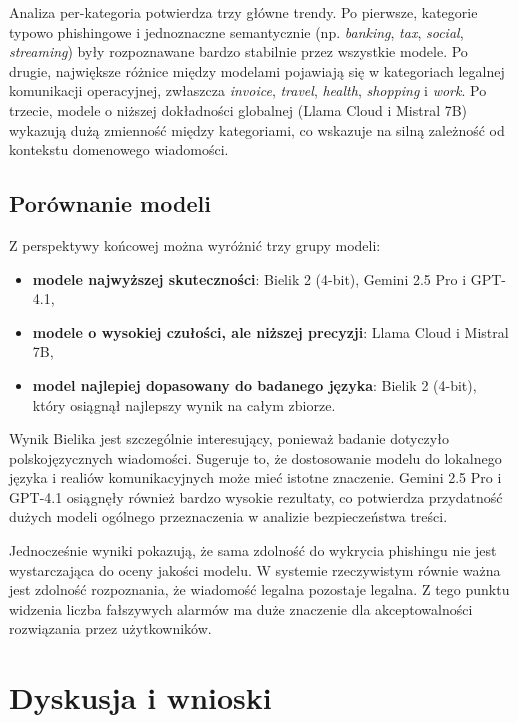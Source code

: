 \documentclass[12pt,a4paper,openany]{report}
\begin{document}
Analiza per-kategoria potwierdza trzy główne trendy. Po pierwsze, kategorie typowo phishingowe i jednoznaczne semantycznie (np. \textit{banking}, \textit{tax}, \textit{social}, \textit{streaming}) były rozpoznawane bardzo stabilnie przez wszystkie modele. Po drugie, największe różnice między modelami pojawiają się w kategoriach legalnej komunikacji operacyjnej, zwłaszcza \textit{invoice}, \textit{travel}, \textit{health}, \textit{shopping} i \textit{work}. Po trzecie, modele o niższej dokładności globalnej (Llama Cloud i Mistral 7B) wykazują dużą zmienność między kategoriami, co wskazuje na silną zależność od kontekstu domenowego wiadomości.

\section{Porównanie modeli}

Z perspektywy końcowej można wyróżnić trzy grupy modeli:

\begin{itemize}
    \item \textbf{modele najwyższej skuteczności}: Bielik 2 (4-bit), Gemini 2.5 Pro i GPT-4.1,
    \item \textbf{modele o wysokiej czułości, ale niższej precyzji}: Llama Cloud i Mistral 7B,
    \item \textbf{model najlepiej dopasowany do badanego języka}: Bielik 2 (4-bit), który osiągnął najlepszy wynik na całym zbiorze.
\end{itemize}

Wynik Bielika jest szczególnie interesujący, ponieważ badanie dotyczyło polskojęzycznych wiadomości. Sugeruje to, że dostosowanie modelu do lokalnego języka i realiów komunikacyjnych może mieć istotne znaczenie. Gemini 2.5 Pro i GPT-4.1 osiągnęły również bardzo wysokie rezultaty, co potwierdza przydatność dużych modeli ogólnego przeznaczenia w analizie bezpieczeństwa treści.

Jednocześnie wyniki pokazują, że sama zdolność do wykrycia phishingu nie jest wystarczająca do oceny jakości modelu. W systemie rzeczywistym równie ważna jest zdolność rozpoznania, że wiadomość legalna pozostaje legalna. Z tego punktu widzenia liczba fałszywych alarmów ma duże znaczenie dla akceptowalności rozwiązania przez użytkowników.

\chapter{Dyskusja i wnioski}
\end{document}
